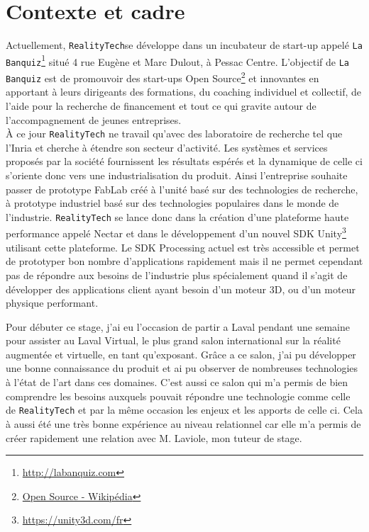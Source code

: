 \section{Contexte et cadre}
\label{sec:contexte}
Actuellement, \texttt{RealityTech}se développe dans un incubateur de start-up appelé \texttt{La Banquiz}\footnote{\href{http://labanquiz.com}{http://labanquiz.com}} situé 4 rue Eugène et Marc Dulout, à Pessac Centre. L'objectif de \texttt{La Banquiz} est de promouvoir des start-ups Open Source\footnote{\href{https://fr.wikipedia.org/wiki/Open\_source}{Open Source - Wikipédia}} et innovantes en apportant à leurs dirigeants des formations, du coaching individuel et collectif, de l'aide pour la recherche de financement et tout ce qui gravite autour de l'accompagnement de jeunes entreprises.\\

À ce jour \texttt{RealityTech} ne travail qu'avec des laboratoire de recherche tel que l'Inria et cherche à étendre son secteur d'activité. Les systèmes et services proposés par la société fournissent les résultats espérés et la dynamique de celle ci s'oriente donc vers une industrialisation du produit. Ainsi l'entreprise souhaite passer de prototype FabLab créé à l'unité basé sur des technologies de recherche, à prototype industriel basé sur des technologies populaires dans le monde de l'industrie. \texttt{RealityTech} se lance donc dans la création d'une plateforme haute performance appelé Nectar et dans le développement d'un nouvel SDK Unity\footnote{\href{https://unity3d.com/fr}{https://unity3d.com/fr}} utilisant cette plateforme. Le SDK Processing actuel est très accessible et permet de prototyper bon nombre d'applications rapidement mais il ne permet cependant pas de répondre aux besoins de l'industrie plus spécialement quand il s'agit de développer des applications client ayant besoin d'un moteur 3D, ou d'un moteur physique performant.

Pour débuter ce stage, j'ai eu l'occasion de partir a Laval pendant une semaine pour assister au Laval Virtual, le plus grand salon international sur la réalité augmentée et virtuelle, en tant qu'exposant. Grâce a ce salon, j'ai pu développer une bonne connaissance du produit et ai pu observer de nombreuses technologies à l'état de l'art dans ces domaines. C'est aussi ce salon qui m'a permis de bien comprendre les besoins auxquels pouvait répondre une technologie comme celle de \texttt{RealityTech} et par la même occasion les enjeux et les apports de celle ci. Cela à aussi été une très bonne expérience au niveau relationnel car elle m'a permis de créer rapidement une relation avec M. Laviole, mon tuteur de stage.

